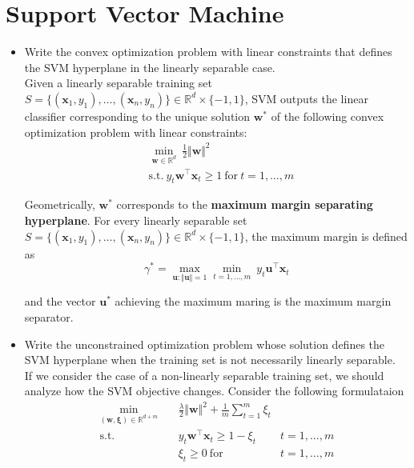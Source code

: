 \newpage
\section{Support Vector Machine}

\begin{itemize}
    
    \item Write the convex optimization problem with linear constraints that defines the SVM hyperplane in the linearly separable case.\\
        
        Given a linearly separable training set $S = \{(\boldsymbol{x}_1, y_1), \dots, (\boldsymbol{x}_n, y_n)\} \in \mathbb{R}^d \times \{-1, 1\}$, SVM outputs the linear classifier corresponding to the unique solution $\boldsymbol{w}^*$ of the following convex optimization problem with linear constraints:
            \begin{align*} 
                & \underset{\boldsymbol{w} \in \mathbb{R}^d}{\min} \ \frac{1}{2} \Vert \boldsymbol{w} \Vert^2 \\
                & \text{s.t.} \ y_t \boldsymbol{w}^\top \boldsymbol{x}_t \geq 1 \ \text{for} \ t = 1, \dots, m 
            \end{align*}

            Geometrically, $\boldsymbol{w}^*$ corresponds to the \textbf{maximum margin separating hyperplane}. For every linearly separable set $S = \{(\boldsymbol{x}_1, y_1), \dots, (\boldsymbol{x}_n, y_n)\} \in \mathbb{R}^d \times \{-1, 1\}$, the maximum margin is defined as 
            $$
            \gamma^* = \underset{\boldsymbol{u} : \Vert \boldsymbol{u} \Vert = 1}{\max} \underset{t = 1, \dots, m}{\min} \ y_t \boldsymbol{u}^\top \boldsymbol{x}_t
            $$ 

            and the vector $\boldsymbol{u}^*$ achieving the maximum maring is the maximum margin separator.

    \item Write the unconstrained optimization problem whose solution defines the SVM hyperplane when the training set is not necessarily linearly separable.\\

        If we consider the case of a non-linearly separable training set, we should analyze how the SVM objective changes. Consider the following formulataion
        \begin{align*}
            \underset{(\boldsymbol{w}, \boldsymbol{\xi}) \in \mathbb{R}^{d+m}}{\min} \quad & \frac{\lambda}{2} \Vert \boldsymbol{w} \Vert^2 + \frac{1}{m} \sum_{t = 1}^m \xi_t \\
            \text{s.t.} \quad & y_t \boldsymbol{w}^\top \boldsymbol{x}_t \geq 1 - \xi_t & t = 1, \dots, m \\
            & \xi_t \geq 0 \ \text{for} & t = 1, \dots, m
        \end{align*}


\end{itemize}
